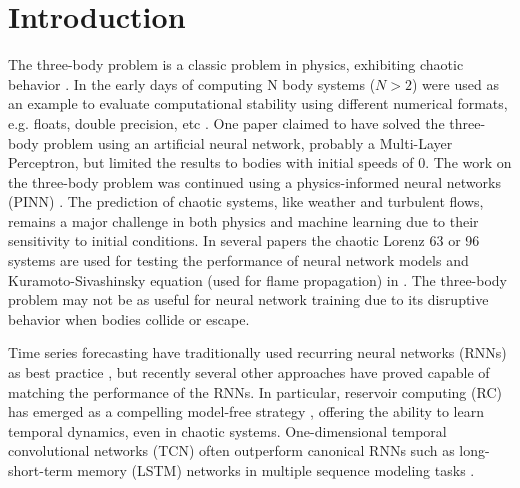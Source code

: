 \documentclass[%
 reprint,
 amsmath,amssymb,
 aps,
]{revtex4-2}
\begin{document}
\maketitle




\section{\label{sec:intro}Introduction} %

The three-body problem is a classic problem in physics, exhibiting chaotic behavior \cite{birkhoff1927dynamical}. In the early days of computing N body systems ($N>2$) were used as an example to evaluate computational stability using different numerical formats, e.g. floats, double precision, etc \cite{DejongheAndHut1986}. One paper \cite{Breen_2020} claimed to have solved the three-body problem using an artificial neural network, probably a Multi-Layer Perceptron, but limited the results to bodies with initial speeds of 0. The work on the three-body problem was continued using a physics-informed neural networks (PINN) \cite{pereira2025advancingsolutionsthreebodyproblem}.
The prediction of chaotic systems, like weather and turbulent flows, remains a major challenge in both physics and machine learning due to their sensitivity to initial conditions. In several papers the chaotic Lorenz 63 or 96 systems are used for testing the performance of neural network models \cite{vlachas2018data, Chattopadhyay2019} and Kuramoto-Sivashinsky equation (used for flame propagation) in \cite{pathak2018model, vlachas2018data}. The three-body problem may not be as useful for neural network training due to its disruptive behavior when bodies collide or escape.

Time series forecasting have traditionally used recurring neural networks (RNNs) as best practice \cite{vlachas2018data}, but recently several other approaches have proved capable of matching the performance of the RNNs. In particular, reservoir computing (RC) has emerged as a compelling model-free strategy \cite{pathak2018model, Chattopadhyay2019}, offering the ability to learn temporal dynamics, even in chaotic systems. One-dimensional temporal convolutional networks (TCN) often outperform canonical RNNs such as long-short-term memory (LSTM) networks in multiple sequence modeling tasks \cite{bai2018empiricalevaluationgenericconvolutional, luo2024moderntcn}. 
\end{document}
